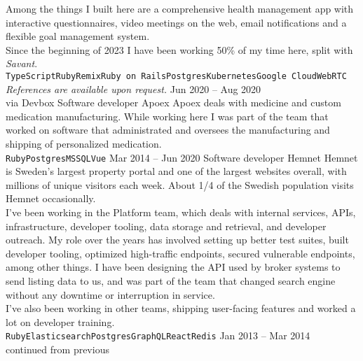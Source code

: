 \documentclass[9pt]{developercv} %
\begin{document}
\begin{entrylist}
{    Among the things I built here are a comprehensive health management app with
    interactive questionnaires, video meetings on the web, email notifications
    and a flexible goal management system.\\
    Since the beginning of 2023 I have been working 50\% of my time here, split
    with \textit{Savant}.\\
      \texttt{TypeScript}\slashsep\texttt{Ruby}\slashsep\texttt{Remix}\slashsep\texttt{Ruby
      on
      Rails}\slashsep\texttt{Postgres}\slashsep\texttt{Kubernetes}\slashsep\texttt{Google
      Cloud}\slashsep\texttt{WebRTC}\\
    \textit{References are available upon request.}
    }
  \entry
    {Jun 2020 -- Aug 2020\\\footnotesize{via Devbox}}
    {Software developer}
    {Apoex}
    {Apoex deals with medicine and custom medication manufacturing. While
      working here I was part of the team that worked on software that
      administrated and oversees the manufacturing and shipping of personalized
      medication.\\
      \texttt{Ruby}\slashsep\texttt{Postgres}\slashsep\texttt{MSSQL}\slashsep\texttt{Vue}}
  \entry
    {Mar 2014 -- Jun 2020}
    {Software developer}
    {Hemnet}
    {Hemnet is Sweden's largest property portal and one of the largest websites
      overall, with millions of unique visitors each week. About 1/4 of the
      Swedish population visits Hemnet occasionally.\\ I've been working in the
      Platform team, which deals with internal services, APIs, infrastructure,
      developer tooling, data storage and retrieval, and developer outreach. My
      role over the years has involved setting up better test suites, built
      developer tooling, optimized high-traffic endpoints, secured vulnerable
      endpoints, among other things. I have been designing the API used by
      broker systems to send listing data to us, and was part of the team that
      changed search engine without any downtime or interruption in service.\\
      I've also been working in other teams, shipping user-facing features and
      worked a lot on developer training.\\
      \texttt{Ruby}\slashsep\texttt{Elasticsearch}\slashsep\texttt{Postgres}\slashsep\texttt{GraphQL}\slashsep\texttt{React}\slashsep\texttt{Redis}}
  \entry
    {Jan 2013 -- Mar 2014\\\footnotesize{continued from previous}}

\end{entrylist}
\end{document}
